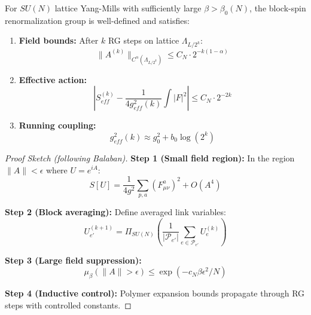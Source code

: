 \begin{theorem}
\label{thm:balaban_uv}
For $SU(N)$ lattice Yang-Mills with sufficiently large $\beta > \beta_0(N)$, the block-spin renormalization group is well-defined and satisfies:
\begin{enumerate}
\item \textbf{Field bounds:} After $k$ RG steps on lattice $\Lambda_{L/2^k}$:
\begin{equation}
\label{eq:dbg-balaban-field-bounds}
\|A^{(k)}\|_{C^\alpha(\Lambda_{L/2^k})} \leq C_N \cdot 2^{-k(1-\alpha)}
\end{equation}

\item \textbf{Effective action:}
\begin{equation}
\label{eq:dbg-balaban-effective-action}
\left| S_{eff}^{(k)} - \frac{1}{4g_{eff}^2(k)} \int |F|^2 \right| \leq C_N \cdot 2^{-2k}
\end{equation}

\item \textbf{Running coupling:}
\begin{equation}
\label{eq:dbg-balaban-running-coupling}
g_{eff}^2(k) \approx g_0^2 + b_0 \log(2^k)
\end{equation}
\end{enumerate}
\end{theorem}

\begin{proof}[Proof Sketch (following Balaban)]
\textbf{Step 1 (Small field region):}
In the region $\|A\| < \epsilon$ where $U = e^{iA}$:
\begin{equation}
S[U] = \frac{1}{4g^2} \sum_{p,a} (F^a_{\mu\nu})^2 + O(A^4)
\end{equation}

\textbf{Step 2 (Block averaging):}
Define averaged link variables:
\begin{equation}
U_{e'}^{(k+1)} = \Pi_{SU(N)}\left(\frac{1}{|\mathcal{P}_{e'}|} \sum_{e \in \mathcal{P}_{e'}} U_e^{(k)}\right)
\end{equation}

\textbf{Step 3 (Large field suppression):}
\begin{equation}
\mu_\beta(\|A\| > \epsilon) \leq \exp(-c_N \beta \epsilon^2 / N)
\end{equation}

\textbf{Step 4 (Inductive control):}
Polymer expansion bounds propagate through RG steps with controlled constants.
\end{proof}

